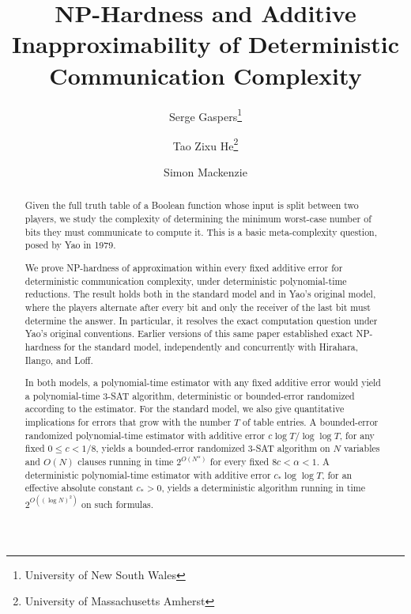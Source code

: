 \documentclass[11pt,letterpaper]{article} \usepackage[utf8]{inputenc}
\theoremstyle{plain} \newtheorem{theorem}{Theorem}[section]
\theoremstyle{definition} \newaliascnt{definition}{theorem}
\begin{document}
\title{NP-Hardness and Additive Inapproximability of Deterministic Communication Complexity}
\author{Serge Gaspers\thanks{University of New South Wales} \and
Tao Zixu He\thanks{University of Massachusetts Amherst} \and
Simon Mackenzie\footnotemark[1]}
\date{}
\hypersetup{pageanchor=false}
\begin{titlepage}
\maketitle
\thispagestyle{empty}

\begin{abstract}
Given the full truth table of a Boolean function whose input is split
between two players, we study the complexity of determining the minimum
worst-case number of bits they must communicate to compute it. This is a
basic meta-complexity question, posed by Yao in 1979.

We prove NP-hardness of approximation within every fixed additive error
for deterministic communication complexity, under deterministic
polynomial-time reductions. The result holds both in the standard model
and in Yao's original model, where the players alternate after every bit
and only the receiver of the last bit must determine the answer. In
particular, it resolves the exact computation question under Yao's original
conventions. Earlier versions of this same paper established exact
NP-hardness for the standard model, independently and concurrently with
Hirahara, Ilango, and Loff.

In both models, a polynomial-time estimator with any fixed additive error
would yield a polynomial-time $3$-SAT algorithm, deterministic or
bounded-error randomized according to the estimator. For the standard
model, we also give quantitative implications for errors that grow with
the number $T$ of table entries. A bounded-error randomized polynomial-time
estimator with additive error $c\log T/\log\log T$, for any fixed
$0\le c<1/8$, yields a bounded-error randomized $3$-SAT algorithm on $N$
variables and $O(N)$ clauses running in time $2^{O(N^\alpha)}$ for every
fixed $8c<\alpha<1$. A deterministic polynomial-time estimator with additive
error $c_*\log\log T$, for an effective absolute constant $c_*>0$, yields a
deterministic algorithm running in time $2^{O((\log N)^2)}$ on such formulas.
\end{abstract}

\end{titlepage}
\setcounter{page}{1}
\hypersetup{pageanchor=true}
\end{document}
